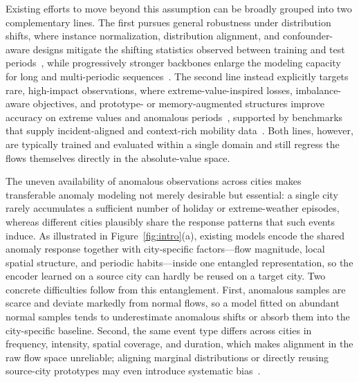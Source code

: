 Existing efforts to move beyond this assumption can be broadly grouped into two complementary lines. The first pursues general robustness under distribution shifts, where instance normalization, distribution alignment, and confounder-aware designs mitigate the shifting statistics observed between training and test periods~\cite{revin,timealign,steve}, while progressively stronger backbones enlarge the modeling capacity for long and multi-periodic sequences~\cite{iTransformer,autoformer,informer,crossformer}. The second line instead explicitly targets rare, high-impact observations, where extreme-value-inspired losses, imbalance-aware objectives, and prototype- or memory-augmented structures improve accuracy on extreme values and anomalous periods~\cite{evl,ealgap,dan,stssdl}, supported by benchmarks that supply incident-aligned and context-rich mobility data~\cite{traffident,stcontext}. Both lines, however, are typically trained and evaluated within a single domain and still regress the flows themselves directly in the absolute-value space.


The uneven availability of anomalous observations across cities makes transferable anomaly modeling not merely desirable but essential: a single city rarely accumulates a sufficient number of holiday or extreme-weather episodes, whereas different cities plausibly share the response patterns that such events induce. As illustrated in Figure~\ref{fig:intro}(a), existing models encode the shared anomaly response together with city-specific factors—flow magnitude, local spatial structure, and periodic habits—inside one entangled representation, so the encoder learned on a source city can hardly be reused on a target city. Two concrete difficulties follow from this entanglement. First, anomalous samples are scarce and deviate markedly from normal flows, so a model fitted on abundant normal samples tends to underestimate anomalous shifts or absorb them into the city-specific baseline. Second, the same event type differs across cities in frequency, intensity, spatial coverage, and duration, which makes alignment in the raw flow space unreliable; aligning marginal distributions or directly reusing source-city prototypes may even introduce systematic bias~\cite{timealign,protots}.

